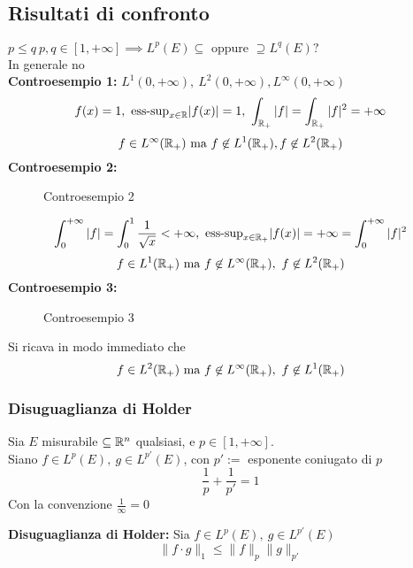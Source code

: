 \subsection{Risultati di confronto}
$p\le q\ p,q\in[1,+\infty]\implies  L^p(E)\subseteq \text{ oppure }\supseteq L^q(E)?$
\\In generale no
\\\textbf{Controesempio 1:} $L^1(0,+\infty), \ L^2(0,+\infty),L^\infty(0,+\infty)$
\[f(x)=1,\ \text{ess-sup}_{x\in\R}|f(x)|=1,\ \int_{\R_+}^{} |f|=\int_{\R_+}^{} |f|^2=+\infty\]  
\[f\in L^{\infty}(\mathbb{R}_+)\text{ ma }f\not\in L^1(\mathbb{R}_+),f\not\in L^2(\mathbb{R}_+)\]
\textbf{Controesempio 2:} 
\begin{figure}[ht]
    \centering
    \caption{Controesempio 2}
    \label{fig:esempio2}
\end{figure}
\[\int_{0}^{+\infty} |f|=\int_{0}^{1} \frac{1}{\sqrt{x} }<+\infty,\ \text{ess-sup}_{x\in\R_+}|f(x)|=+\infty=\int_{0}^{+\infty}|f|^2\]
\[f\in L^1(\mathbb{R}_+)\text{ ma }f\not\in L^\infty(\mathbb{R}_+),\ f\not\in L^2(\mathbb{R}_+)\]
\textbf{Controesempio 3:} 
\begin{figure}[ht]
    \centering
    \caption{Controesempio 3}
    \label{fig:controesempio3}
\end{figure}
Si ricava in modo immediato che 
\[f\in L^2(\mathbb{R}_+)\text{ ma }f\not\in L^\infty(\mathbb{R}_+),\ f\not\in L^1(\mathbb{R}_+)\]
\newpage
\subsubsection{Disuguaglianza di Holder}
\begin{tcolorbox}
	Sia $E$ misurabile $\subseteq \mathbb{R}^n$ qualsiasi, e $p \in [1,+\infty]$.
	\\Siano $f\in L^p(E),\ g\in L^{p'}(E)$, con $p':=$ esponente coniugato di $p$
	\[\frac{1}{p}+\frac{1}{p'}=1\]
	Con la convenzione $\frac{1}{\infty}=0$ 
\end{tcolorbox}
\begin{tcolorbox}
	\textbf{Disuguaglianza di Holder: }Sia $f\in L^p(E),\ g\in L^{p'}(E)$
	\[\|f\cdot g\|_1\le \|f\|_p\|g\|_{p'}\]
\end{tcolorbox}

